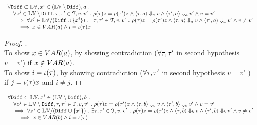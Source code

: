 \begin{lem}
	\label{lem:inv_a_gnl}
	\[
		\begin{array}{l}
		\forall \mathtt{Diff} \subset \mathbb{LV},  x^i \in (\mathbb{LV} \setminus \mathtt{Diff}), a ~.~
		\\ \quad
		\forall z^j \in \mathbb{LV} \setminus \mathtt{Diff}, \mathtt{\tau}, \mathtt{\tau}' \in \mathcal{T}, v, v' ~.~ 
		\rho(\mathtt{\tau}) z = \rho(\mathtt{\tau}') z \land 
		\langle \mathtt{\tau}, a \rangle \Downarrow_a v \land \langle \mathtt{\tau}', a \rangle \Downarrow_a v' \land v = v'
		\\ \quad
		\implies 
		\forall z^j \in \mathbb{LV} / (\mathtt{Diff} \cup \{x^i\} ) ~.~ 
		 \exists \mathtt{\tau}, \mathtt{\tau}' \in \mathcal{T}, v, v'~.~ 
		\rho(\mathtt{\tau}) z = \rho(\mathtt{\tau}') z \land 
		\langle \mathtt{\tau}, a \rangle \Downarrow_a v \land \langle \mathtt{\tau}', a \rangle \Downarrow_a v' \land v \neq v'
		\\ \qquad
		\implies x \in VAR(a) \land i = \iota(\mathtt{\tau}) x
		\end{array}
	\]
	\end{lem}
\begin{proof}.
	\\
	To show $x \in VAR(a)$, by showing contradiction ($\forall \mathtt{\tau}, \mathtt{\tau}'$ in second hypothesis  $v = v'$)
	 if $x \notin VAR(a)$.
	 \\
	To show $i = \iota(\mathtt{\tau})$, by showing contradiction ($\forall \mathtt{\tau}, \mathtt{\tau}'$ in second hypothesis  $v = v'$ ) 
	if $j = \iota(\mathtt{\tau}) x$ and $i \neq j$.
\end{proof}
\begin{lem}
		\label{lem:inv_b_gnl}
		\[
			\begin{array}{l}
			\forall \mathtt{Diff} \subset \mathbb{LV},  x^i \in (\mathbb{LV} \setminus \mathtt{Diff}), b ~.~
			\\ \quad
			\forall z^j \in \mathbb{LV} \setminus \mathtt{Diff}, \mathtt{\tau}, \mathtt{\tau}' \in \mathcal{T}, v, v' ~.~ 
			\rho(\mathtt{\tau}) z = \rho(\mathtt{\tau}') z \land 
			\langle \mathtt{\tau}, b \rangle \Downarrow_b v \land \langle \mathtt{\tau}', b \rangle \Downarrow_b v' \land v = v'
			\\ \quad
			\implies 
			\forall z^j \in \mathbb{LV} / (\mathtt{Diff} \cup \{x^i\} ) ~.~ 
			 \exists \mathtt{\tau}, \mathtt{\tau}' \in \mathcal{T}, v, v'~.~ 
			\rho(\mathtt{\tau}) z = \rho(\mathtt{\tau}') z \land 
			\langle \mathtt{\tau}, b \rangle \Downarrow_b v \land \langle \mathtt{\tau}', b \rangle \Downarrow_b v' \land v \neq v'
			\\ \qquad
			\implies x \in VAR(b) \land i = \iota(\mathtt{\tau})
			\end{array}
		\]
\end{lem}%
